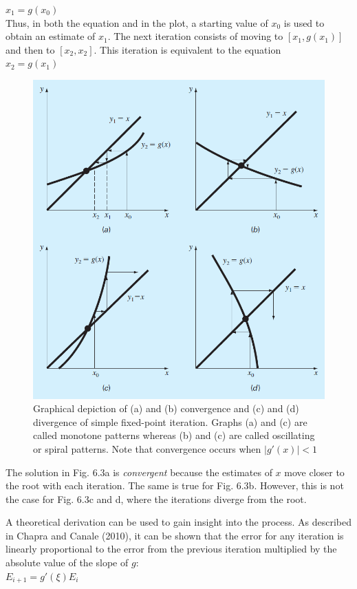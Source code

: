 \documentclass[../main.tex]{subfiles}
\begin{document}
$x_1 = g(x_0)$\\

\noindent Thus, in both the equation and in the plot, a starting value of $x_0$ is used to obtain an estimate
of $x_1$. The next iteration consists of moving to $[x_1, g(x_1)]$ and then to $[x_2, x_2]$. This
iteration is equivalent to the equation\\

$x_2 = g(x_1)$\\

\begin{figure}[h]
    \includegraphics[width=0.65\linewidth]{./images/fig_6_3}
    \caption{Graphical depiction of (a) and (b) convergence and (c) and (d) divergence of simple fixed-point
    iteration. Graphs (a) and (c) are called monotone patterns whereas (b) and (c) are called
    oscillating or spiral patterns. Note that convergence occurs when $\left\lvert g'(x) \right\rvert < 1$ }
\end{figure}

The solution in Fig. 6.3a is \emph{convergent} because the estimates of $x$ move closer to the
root with each iteration. The same is true for Fig. 6.3b. However, this is not the case for
Fig. 6.3c and d, where the iterations diverge from the root.

A theoretical derivation can be used to gain insight into the process. As described in
Chapra and Canale (2010), it can be shown that the error for any iteration is linearly proportional
to the error from the previous iteration multiplied by the absolute value of the
slope of $g$:\\

$E_{i+1} = g'(\xi)E_i$\\
\end{document}
